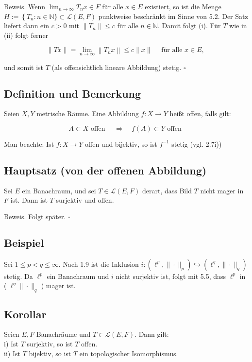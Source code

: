 \documentclass[10pt, letterpaper]{article}
\begin{document}
Beweis. Wenn $\lim _{n \rightarrow \infty} T_{n} x \in F$ für alle $x \in E$ existiert, so ist die Menge $H:=\left\{T_{n}:\right. n \in \mathbb{N}\} \subset \mathcal{L}(E, F)$ punktweise beschränkt im Sinne von 5.2. Der Satz liefert dann ein $c>0$ mit $\left\|T_{n}\right\| \leq c$ für alle $n \in \mathbb{N}$. Damit folgt (i). Für $T$ wie in (ii) folgt ferner

$$
\|T x\|=\lim _{n \rightarrow \infty}\left\|T_{n} x\right\| \leq c\|x\| \quad \text { für alle } x \in E \text {, }
$$

und somit ist $T$ (als offensichtlich lineare Abbildung) stetig. \(\square\)

\subsection*{Definition und Bemerkung}
Seien $X, Y$ metrische Räume. Eine Abbildung $f: X \rightarrow Y$ heißt offen, falls gilt:

$$
A \subset X \text { offen } \quad \Longrightarrow \quad f(A) \subset Y \text { offen }
$$

Man beachte: Ist $f: X \rightarrow Y$ offen und bijektiv, so ist $f^{-1}$ stetig (vgl. 2.7i))

\subsection*{Hauptsatz (von der offenen Abbildung)}
Sei $E$ ein Banachraum, und sei $T \in \mathcal{L}(E, F)$ derart, dass Bild $T$ nicht mager in $F$ ist. Dann ist $T$ surjektiv und offen.

Beweis. Folgt später. \(\square\)

\subsection*{Beispiel}
Sei $1 \leq p<q \leq \infty$. Nach 1.9 ist die Inklusion $i:\left(\ell^{p},\|\cdot\|_{p}\right) \hookrightarrow\left(\ell^{q},\|\cdot\|_{q}\right)$ stetig. Da $\ell^{p}$ ein Banachraum und $i$ nicht surjektiv ist, folgt mit 5.5, dass $\ell^{p}$ in ( $\ell^{q}\|\cdot\|_{q}$ ) mager ist.

\subsection*{Korollar}
Seien $E, F$ Banachräume und $T \in \mathcal{L}(E, F)$. Dann gilt:\\
i) Ist $T$ surjektiv, so ist $T$ offen.\\
ii) Ist $T$ bijektiv, so ist $T$ ein topologischer Isomorphismus.
\end{document}
